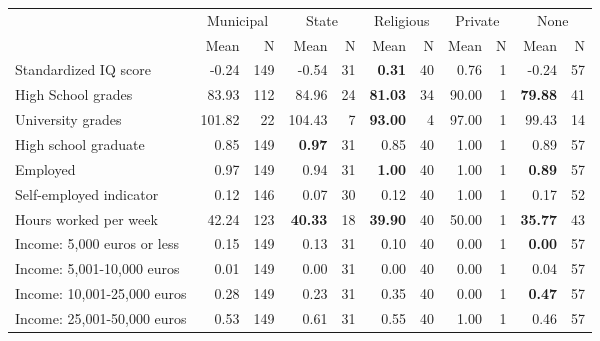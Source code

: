 \begin{tabular}{l r r r r r r r r r r}
\toprule
& \multicolumn{2}{c}{Municipal} & \multicolumn{2}{c}{State} & \multicolumn{2}{c}{Religious} & \multicolumn{2}{c}{Private} & \multicolumn{2}{c}{None} \\
& \scriptsize Mean & \scriptsize N & \scriptsize Mean & \scriptsize N & \scriptsize Mean & \scriptsize N & \scriptsize Mean & \scriptsize N & \scriptsize Mean & \scriptsize N \\
\midrule
Standardized IQ score &     -0.24 &       149 &     -0.54 &        31 & \textbf{     0.31} &        40 &      0.76 &         1 &     -0.24 &        57 \\
High School grades &     83.93 &       112 &     84.96 &        24 & \textbf{    81.03} &        34 &     90.00 &         1 & \textbf{    79.88} &        41 \\
University grades &    101.82 &        22 &    104.43 &         7 & \textbf{    93.00} &         4 &     97.00 &         1 &     99.43 &        14 \\
High school graduate &      0.85 &       149 & \textbf{     0.97} &        31 &      0.85 &        40 &      1.00 &         1 &      0.89 &        57 \\
Employed &      0.97 &       149 &      0.94 &        31 & \textbf{     1.00} &        40 &      1.00 &         1 & \textbf{     0.89} &        57 \\
Self-employed indicator &      0.12 &       146 &      0.07 &        30 &      0.12 &        40 &      1.00 &         1 &      0.17 &        52 \\
Hours worked per week &     42.24 &       123 & \textbf{    40.33} &        18 & \textbf{    39.90} &        40 &     50.00 &         1 & \textbf{    35.77} &        43 \\
Income: 5,000 euros or less &      0.15 &       149 &      0.13 &        31 &      0.10 &        40 &      0.00 &         1 & \textbf{     0.00} &        57 \\
Income: 5,001-10,000 euros &      0.01 &       149 &      0.00 &        31 &      0.00 &        40 &      0.00 &         1 &      0.04 &        57 \\
Income: 10,001-25,000 euros &      0.28 &       149 &      0.23 &        31 &      0.35 &        40 &      0.00 &         1 & \textbf{     0.47} &        57 \\
Income: 25,001-50,000 euros &      0.53 &       149 &      0.61 &        31 &      0.55 &        40 &      1.00 &         1 &      0.46 &        57 \\

\end{tabular}
